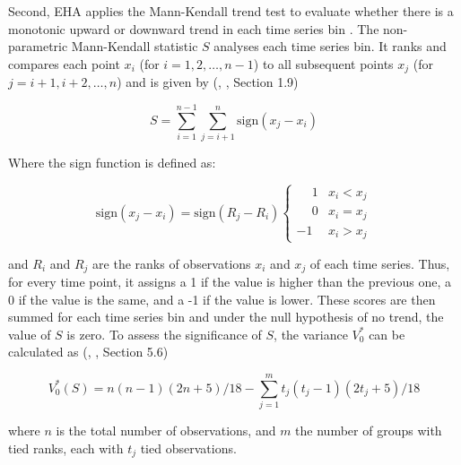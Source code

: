 \bigskip

Second, EHA applies the Mann-Kendall trend test to evaluate whether there is a monotonic upward or downward trend in each time series bin \citep{mann1945nonparametric,kendall1990rank}.
The non-parametric Mann-Kendall statistic \(S\) analyses each time series bin. It ranks and compares each point \( x_i \) (for \( i = 1, 2, \ldots, n-1 \)) 
to all subsequent points \( x_j \) (for \( j = i+1, i+2, \ldots, n \)) and is given by (\citeauthor{kendall1990rank}, \citeyear{kendall1990rank}, Section 1.9)

\begin{equation}
S = \sum_{i=1}^{n-1} \sum_{j=i+1}^{n} \text{sign}(x_j - x_i)
\end{equation}

\bigskip

Where the sign function is defined as:

\begin{equation}
\text{sign}(x_j - x_i) = \text{sign}(R_j - R_i)
\begin{cases}
\phantom{-}1 & x_i < x_j \\
\phantom{-}0 & x_i = x_j \\
  -1 & x_i > x_j
\end{cases}
\end{equation}

\bigskip

and \(R_i\) and \(R_j\) are the ranks of observations \(x_i\) and \(x_j\) of each time series.
Thus, for every time point, it assigns a 1 if the value is higher than the previous one, a 0 if the value is the same, and a -1 if the value is lower. These scores are
then summed for each time series bin and under the null hypothesis of no trend, the value of \(S\) is zero. To assess the significance of \(S\), the variance \(V^*_0\)
can be calculated as (\citeauthor{kendall1990rank}, \citeyear{kendall1990rank}, Section 5.6)

\begin{equation}
    V^*_0 (S) = n(n - 1)(2n + 5) / 18 - \sum_{j=1}^{m} t_j(t_j - 1)(2t_j + 5) /18
\end{equation}

\bigskip

where \(n\) is the total number of observations, and \(m\) the number of groups with tied ranks, each with \(t_j\) tied observations. 
